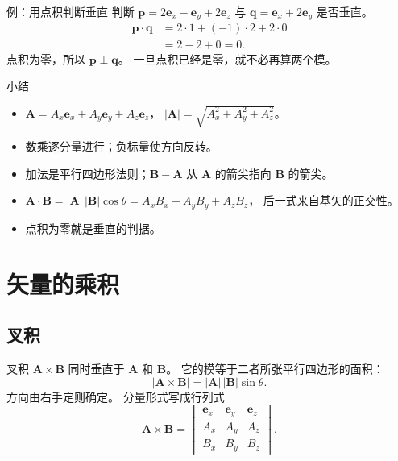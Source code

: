 \documentclass[fontset=windows, chinese, 10pt, xcolor=dvipsnames]{beamer}
\newcommand{\vecfig}[1]{%
  \IfFileExists{tikz/#1.tex}%
    {}%
    {}}
\begin{document}

\begin{frame}{例：用点积判断垂直}
  判断
  $\mathbf{p}=2\mathbf{e}_x-\mathbf{e}_y+2\mathbf{e}_z$
  与
  $\mathbf{q}=\mathbf{e}_x+2\mathbf{e}_y$
  是否垂直。
  \vspace{0.5em}
  \begin{align*}
    \mathbf{p}\cdot\mathbf{q}
    &= 2\cdot 1+(-1)\cdot 2+2\cdot 0 \\
    &= 2-2+0
     = 0.
  \end{align*}
  点积为零，所以 $\mathbf{p}\perp\mathbf{q}$。
  一旦点积已经是零，就不必再算两个模。
\end{frame}

\begin{frame}{小结}
  \begin{itemize}
    \item $\mathbf{A}=A_x\mathbf{e}_x+A_y\mathbf{e}_y+A_z\mathbf{e}_z$，
      $|\mathbf{A}|=\sqrt{A_x^2+A_y^2+A_z^2}$。
    \item 数乘逐分量进行；负标量使方向反转。
    \item 加法是平行四边形法则；$\mathbf{B}-\mathbf{A}$ 从 $\mathbf{A}$ 的箭尖指向 $\mathbf{B}$ 的箭尖。
    \item $\mathbf{A}\cdot\mathbf{B}=|\mathbf{A}|\,|\mathbf{B}|\cos\theta
      =A_xB_x+A_yB_y+A_zB_z$，
      后一式来自基矢的正交性。
    \item 点积为零就是垂直的判据。
  \end{itemize}
\end{frame}

\section{矢量的乘积}

\subsection{叉积}

\begin{frame}{叉积}
  $\mathbf{A}\times\mathbf{B}$ 同时垂直于 $\mathbf{A}$ 和 $\mathbf{B}$。
  它的模等于二者所张平行四边形的面积：
  \begin{equation*}
    |\mathbf{A}\times\mathbf{B}|
    = |\mathbf{A}|\,|\mathbf{B}|\sin\theta.
  \end{equation*}
  方向由右手定则确定。
  分量形式写成行列式
  \begin{equation*}
    \mathbf{A}\times\mathbf{B}
    =
    \begin{vmatrix}
      \mathbf{e}_x & \mathbf{e}_y & \mathbf{e}_z \\
      A_x & A_y & A_z \\
      B_x & B_y & B_z
    \end{vmatrix}.
  \end{equation*}
\end{frame}
\end{document}
